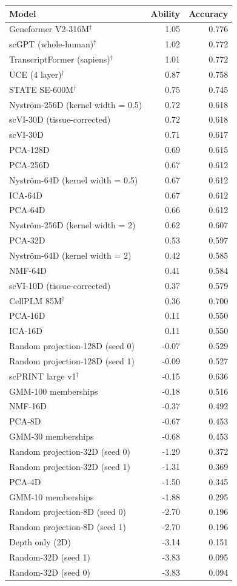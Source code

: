 \begin{tabular}{@{}lrr@{}}
\toprule
Model & Ability & Accuracy \\
\midrule
Geneformer V2-316M$^\dagger$ & 1.05 & 0.776 \\
scGPT (whole-human)$^\dagger$ & 1.02 & 0.772 \\
TranscriptFormer (sapiens)$^\dagger$ & 1.01 & 0.772 \\
UCE (4 layer)$^\dagger$ & 0.87 & 0.758 \\
STATE SE-600M$^\dagger$ & 0.75 & 0.745 \\
Nyström-256D (kernel width = 0.5) & 0.72 & 0.618 \\
scVI-30D (tissue-corrected) & 0.72 & 0.618 \\
scVI-30D & 0.71 & 0.617 \\
PCA-128D & 0.69 & 0.615 \\
PCA-256D & 0.67 & 0.612 \\
Nyström-64D (kernel width = 0.5) & 0.67 & 0.612 \\
ICA-64D & 0.67 & 0.612 \\
PCA-64D & 0.66 & 0.612 \\
Nyström-256D (kernel width = 2) & 0.62 & 0.607 \\
PCA-32D & 0.53 & 0.597 \\
Nyström-64D (kernel width = 2) & 0.42 & 0.585 \\
NMF-64D & 0.41 & 0.584 \\
scVI-10D (tissue-corrected) & 0.37 & 0.579 \\
CellPLM 85M$^\dagger$ & 0.36 & 0.700 \\
PCA-16D & 0.11 & 0.550 \\
ICA-16D & 0.11 & 0.550 \\
Random projection-128D (seed 0) & -0.07 & 0.529 \\
Random projection-128D (seed 1) & -0.09 & 0.527 \\
scPRINT large v1$^\dagger$ & -0.15 & 0.636 \\
GMM-100 memberships & -0.18 & 0.516 \\
NMF-16D & -0.37 & 0.492 \\
PCA-8D & -0.67 & 0.453 \\
GMM-30 memberships & -0.68 & 0.453 \\
Random projection-32D (seed 0) & -1.29 & 0.372 \\
Random projection-32D (seed 1) & -1.31 & 0.369 \\
PCA-4D & -1.50 & 0.345 \\
GMM-10 memberships & -1.88 & 0.295 \\
Random projection-8D (seed 0) & -2.70 & 0.196 \\
Random projection-8D (seed 1) & -2.70 & 0.196 \\
Depth only (2D) & -3.14 & 0.151 \\
Random-32D (seed 1) & -3.83 & 0.095 \\
Random-32D (seed 0) & -3.83 & 0.094 \\
\bottomrule
\end{tabular}
